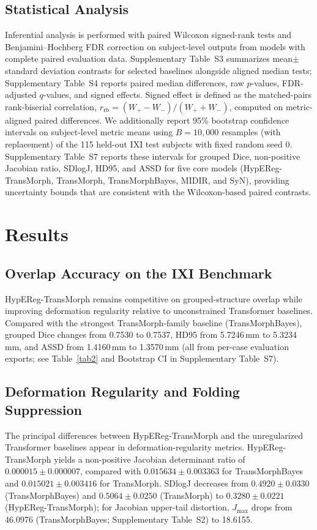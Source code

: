 \documentclass[jimaging,article,submit,pdftex,moreauthors]{Definitions/mdpi}
\begin{document}
\subsection{Statistical Analysis}\label{sec:stats}
Inferential analysis is performed with paired Wilcoxon signed-rank tests \cite{wilcoxon1945} and Benjamini--Hochberg FDR correction \cite{bh1995} on subject-level outputs from models with complete paired evaluation data. Supplementary Table~S3 summarizes mean\(\pm\)standard deviation contrasts for selected baselines alongside aligned median tests; Supplementary Table~S4 reports paired median differences, raw \(p\)-values, FDR-adjusted \(q\)-values, and signed effects. Signed effect is defined as the matched-pairs rank-biserial correlation, \(r_{\mathrm{rb}}=(W_+-W_-)/(W_++W_-)\), computed on metric-aligned paired differences. We additionally report 95\% bootstrap confidence intervals on subject-level metric means using \(B=10{,}000\) resamples (with replacement) of the 115 held-out IXI test subjects with fixed random seed 0. Supplementary Table~S7 reports these intervals for grouped Dice, non-positive Jacobian ratio, SDlogJ, HD95, and ASSD for five core models (HypEReg-TransMorph, TransMorph, TransMorphBayes, MIDIR, and SyN), providing uncertainty bounds that are consistent with the Wilcoxon-based paired contrasts.

\section{Results}\label{sec:results}

\subsection{Overlap Accuracy on the IXI Benchmark}
HypEReg-TransMorph remains competitive on grouped-structure overlap while improving deformation regularity relative to unconstrained Transformer baselines. Compared with the strongest TransMorph-family baseline (TransMorphBayes), grouped Dice changes from 0.7530 to 0.7537, HD95 from 5.7246\,mm to 5.3234\,mm, and ASSD from 1.4160\,mm to 1.3570\,mm (all from per-case evaluation exports; see Table~\ref{tab2} and Bootstrap CI in Supplementary Table~S7).

\subsection{Deformation Regularity and Folding Suppression}
The principal differences between HypEReg-TransMorph and the unregularized Transformer baselines appear in deformation-regularity metrics. HypEReg-TransMorph yields a non-positive Jacobian determinant ratio of \(0.000015 \pm 0.000007\), compared with \(0.015634 \pm 0.003363\) for TransMorphBayes and \(0.015021 \pm 0.003416\) for TransMorph. SDlogJ decreases from \(0.4920 \pm 0.0330\) (TransMorphBayes) and \(0.5064 \pm 0.0250\) (TransMorph) to \(0.3280 \pm 0.0221\) (HypEReg-TransMorph); for Jacobian upper-tail distortion, \(J_{\max}\) drops from 46.0976 (TransMorphBayes; Supplementary Table~S2) to 18.6155.
\end{document}
